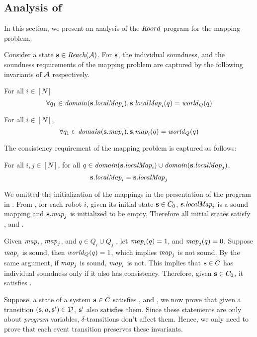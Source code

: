 

\subsection{Analysis of \dmap}
\label{sec:analysis}


In this section, we present an analysis of the $K\kern-2pt oord$ program for the mapping problem.




Consider a state ${\textbf{s}}\in \mathit{Reach}(\mathcal{A})$. For ${\textbf{s}}$, the individual soundness, and the soundness requirements of the mapping problem are captured by the following invariants of $\mathcal{A}$ respectively.


\begin{invariant}
\label{ind-sound}
For all $i \in [N]$ $$\forall q_1 \in \mathit{domain}({\textbf{s}}.\mathit{localMap}_i) , {\textbf{s}}.\mathit{localMap}_i(q) =  \mathit{world}_Q(q)$$
\end{invariant}

\begin{invariant}
\label{sound}
For all $i \in [N]$, $$\forall q_1 \in \mathit{domain}({\textbf{s}}.\mathit{map}_i) , {\textbf{s}}.\mathit{map}_i(q) =  \mathit{world}_Q(q)$$
\end{invariant}

The consistency requirement of the mapping problem is captured as follows:
\begin{invariant}
\label{consistency}
For all $i,j \in [N]$, for all $q \in \mathit{domain}({\textbf{s}}.\mathit{localMap}_i)\cup \mathit{domain}({\textbf{s}}.\mathit{localMap}_j)$, $${\textbf{s}}.\mathit{localMap}_i = {\textbf{s}}.\mathit{localMap}_j$$
\end{invariant}

We omitted the initialization of the mappings in the presentation of the program in . From , for each robot $i$, given its initial state ${\textbf{s}}\in C_0$, ${\textbf{s}}.\mathit{localMap}_i$ is a sound mapping and ${\textbf{s}}.\mathit{map}_j$ is initialized to be empty, Therefore all initial states satisfy , and .


Given $\mathit{map}_i$, $\mathit{map}_j$, and $q\in Q_i \cup Q_j$ , let $\mathit{map}_i(q) = 1$, and $\mathit{map}_j(q) = 0$. Suppose $\mathit{map}_i$ is sound, then $\mathit{world}_Q(q) = 1$, which implies $\mathit{map}_j$ is not sound. By the same argument, if $\mathit{map}_j$ is sound, $\mathit{map}_i$ is not. This implies that ${\textbf{s}}\in C$ has individual soundness only if it also has consistency. Therefore, given ${\textbf{s}}\in C_0$, it satisfies .


Suppose, a state of a system ${\textbf{s}}\in C$ satisfies ,  and  , we now prove that given a transition $({\textbf{s}}, a, {\textbf{s}}')\in \mathcal{D}$, ${\textbf{s}}'$ also satisfies them. Since these statements are only about \emph{program} variables, $\delta$-transitions don't affect them. Hence, we only need to prove that each event transition preserves these invariants.

